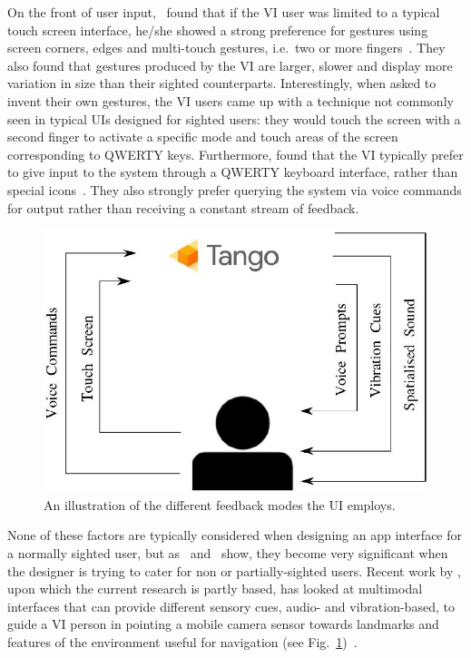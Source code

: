 \documentclass[format=sigconf, review=true, screen=true, anonymous=true]{acmart}
\begin{document}
On the front of user input,~\citeauthor{kane2011} found that if the VI user was limited to a typical touch screen interface, he/she showed a strong preference for gestures using screen corners, edges and multi-touch gestures, i.e.\ two or more fingers~\cite{kane2011}. They also found that gestures produced by the VI are larger, slower and display more variation in size than their sighted counterparts. Interestingly, when asked to invent their own gestures, the VI users came up with a technique not commonly seen in typical UIs designed for sighted users: they would touch the screen with a second finger to activate a specific mode and touch areas of the screen corresponding to QWERTY keys. Furthermore, \citeauthor{tian2013} found that the VI typically prefer to give input to the system through a QWERTY keyboard interface, rather than special icons~\cite{tian2013}. They also strongly prefer querying the system via voice commands for output rather than receiving a constant stream of feedback.

\begin{figure}
  \centering
  \includegraphics[width=0.8\columnwidth]{figures/multimodal.jpg}
  \caption{An illustration of the different feedback modes the UI employs.\label{fig:multimodal}}
\end{figure}

None of these factors are typically considered when designing an app interface for a normally sighted user, but as~\citeauthor{kane2011} and~\citeauthor{tian2013} show, they become very significant when the designer is trying to cater for non or partially-sighted users. Recent work by \citeauthor{bellotto2013}, upon which the current research is partly based, has looked at multimodal interfaces that can provide different sensory cues, audio- and vibration-based, to guide a VI person in pointing a mobile camera sensor towards landmarks and features of the environment useful for navigation (see Fig.~\ref{fig:multimodal})~\cite{bellotto2013}.
\end{document}
